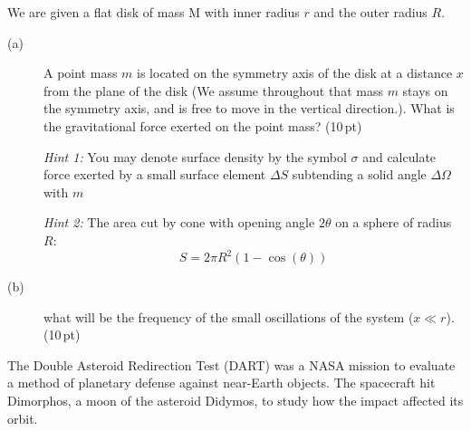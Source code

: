 We are given a flat disk of mass M with inner radius $r$ and the outer radius
$R$.

\begin{description}
\item[(a)] A point mass $m$ is located on the symmetry axis of the disk at a
  distance $x$ from the plane of the disk (We assume throughout that mass $m$
  stays on the symmetry axis, and is free to move in the vertical direction.).
  What is the gravitational force exerted on the point mass? \hfill(10\,pt)


  \emph{Hint 1:} You may denote surface density by the symbol $\sigma$ and
  calculate force exerted by a small surface element $\Delta S$ subtending a
  solid angle $\Delta\Omega$ with $m$

  \emph{Hint 2:} The area cut by cone with opening angle $2\theta$ on a sphere
  of radius $R$:
  \[ S = 2\pi R^2 (1 - \cos(\theta)) \]


\item[(b)] what will be the frequency of the small oscillations of the system
  ($x \ll r$). \hfill(10\,pt)
\end{description}

The Double Asteroid Redirection Test (DART) was a NASA mission to evaluate a
method of planetary defense against near-Earth objects. The spacecraft hit
Dimorphos, a moon of the asteroid Didymos, to study how the impact affected
its orbit.

